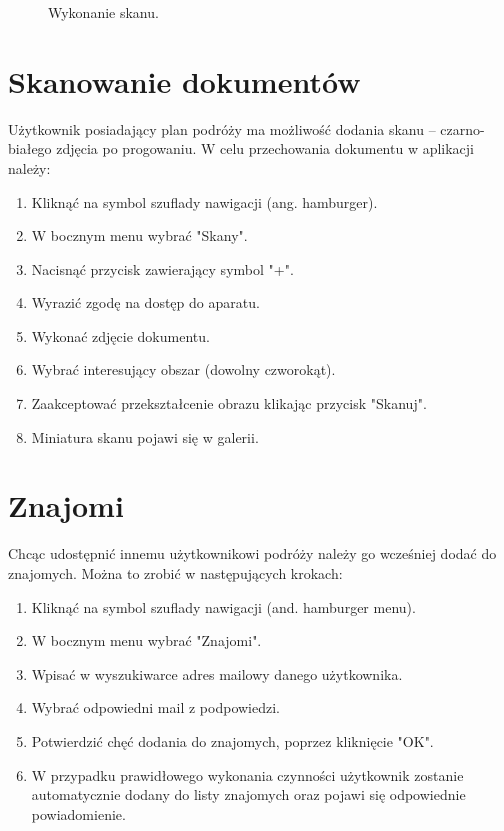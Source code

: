 \begin{figure}[h]

\centering
\null\hfill
{}
\hfill
{}
\hfill\null

\null\hfill
{}
\hfill
{}
\hfill\null

\caption{Wykonanie skanu.}
\label{fig:podrecznik8}
\end{figure}
\FloatBarrier

\section{Skanowanie dokumentów}
Użytkownik posiadający plan podróży ma możliwość dodania skanu – czarno-białego zdjęcia po progowaniu.
W celu przechowania dokumentu w aplikacji należy:
\begin{enumerate}
\item Kliknąć na symbol szuflady nawigacji (ang. hamburger).
\item W bocznym menu wybrać "Skany".
\item Nacisnąć przycisk zawierający symbol "+".
\item Wyrazić zgodę na dostęp do aparatu.
\item Wykonać zdjęcie dokumentu.
\item Wybrać interesujący obszar (dowolny czworokąt).
\item Zaakceptować przekształcenie obrazu klikając przycisk "Skanuj".
\item Miniatura skanu pojawi się w galerii.
\end{enumerate}

\section{Znajomi}
Chcąc udostępnić innemu użytkownikowi podróży należy go wcześniej dodać do znajomych. Można to zrobić w następujących krokach:
\begin{enumerate}
\item Kliknąć na symbol szuflady nawigacji (and. hamburger menu).
\item W bocznym menu wybrać "Znajomi".
\item Wpisać w wyszukiwarce adres mailowy danego użytkownika.
\item Wybrać odpowiedni mail z podpowiedzi.
\item Potwierdzić chęć dodania do znajomych, poprzez kliknięcie "OK".
\item W przypadku prawidłowego wykonania czynności użytkownik zostanie automatycznie dodany do listy znajomych oraz pojawi się odpowiednie powiadomienie.
\end{enumerate}

